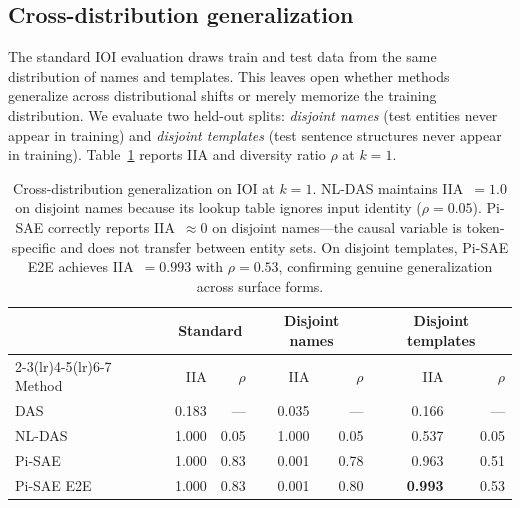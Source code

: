 \documentclass{article}
\begin{document}
\subsection{Cross-distribution generalization}
\label{sec:cross_distribution}

The standard IOI evaluation draws train and test data from the same
distribution of names and templates. This leaves open whether methods
generalize across distributional shifts or merely memorize the training
distribution. We evaluate two held-out splits: \emph{disjoint names}
(test entities never appear in training) and \emph{disjoint templates}
(test sentence structures never appear in training).
Table~\ref{tab:cross_dist} reports IIA and diversity ratio $\rho$ at $k{=}1$.

\begin{table}[t]
\centering
\small
\setlength{\tabcolsep}{3pt}
\begin{tabular}{l rr rr rr}
\toprule
& \multicolumn{2}{c}{Standard} & \multicolumn{2}{c}{Disjoint names} & \multicolumn{2}{c}{Disjoint templates} \\
\cmidrule(lr){2-3}\cmidrule(lr){4-5}\cmidrule(lr){6-7}
Method & IIA & $\rho$ & IIA & $\rho$ & IIA & $\rho$ \\
\midrule
DAS           & 0.183 & ---  & 0.035 & ---  & 0.166 & ---  \\
NL-DAS        & 1.000 & 0.05 & 1.000 & 0.05 & 0.537 & 0.05 \\
Pi-SAE        & 1.000 & 0.83 & 0.001 & 0.78 & 0.963 & 0.51 \\
Pi-SAE E2E    & 1.000 & 0.83 & 0.001 & 0.80 & \textbf{0.993} & 0.53 \\
\bottomrule
\end{tabular}
\caption{Cross-distribution generalization on IOI at $k{=}1$.
  NL-DAS maintains IIA~$= 1.0$ on disjoint names because its
  lookup table ignores input identity ($\rho = 0.05$).
  Pi-SAE correctly reports IIA~$\approx 0$ on disjoint names---the
  causal variable is token-specific and does not transfer between
  entity sets.
  On disjoint templates, Pi-SAE E2E achieves IIA~$= 0.993$ with
  $\rho = 0.53$, confirming genuine generalization across surface
  forms.}
\label{tab:cross_dist}
\end{table}
\end{document}
